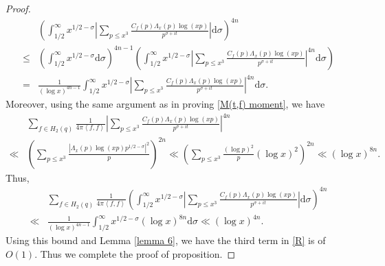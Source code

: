 \documentclass[11pt,reqno]{amsart}
\numberwithin{equation}{section}
\theoremstyle{plain}
\theoremstyle{definition}
\begin{document}
\begin{proof}
\begin{equation*}
\begin{split}
&\left(\int_{1/2}^\infty
x^{1/2-\sigma}\left|\sum_{p\leq x^3}
\frac{C_f(p)\Lambda_x(p)\log(xp)}{p^{\sigma+it}}\right|\mathrm{d}\sigma\right)^{4n}\\
\leq&\left(\int_{1/2}^\infty
x^{1/2-\sigma}\mathrm{d}\sigma\right)^{4n-1}\left(\int_{1/2}^\infty
x^{1/2-\sigma}\left|\sum_{p\leq x^3}
\frac{C_f(p)\Lambda_x(p)\log(xp)}{p^{\sigma+it}}\right|^{4n}\mathrm{d}\sigma\right)\\
=&\frac{1}{(\log x)^{4n-1}}\int_{1/2}^\infty
x^{1/2-\sigma}\left|\sum_{p\leq x^3}
\frac{C_f(p)\Lambda_x(p)\log(xp)}{p^{\sigma+it}}\right|^{4n}\mathrm{d}\sigma.
\end{split}
\end{equation*}
Moreover, using the same argument as in proving \eqref{M(t,f) moment},
we have
\begin{equation*}
\begin{split}
&\sum_{f\in H_2(q)}\frac{1}{4\pi \left<f,f\right>}\left|\sum_{p\leq x^3}
\frac{C_f(p)\Lambda_x(p)\log(xp)}{p^{\sigma+it}}\right|^{4n}\\
\ll&\left(\sum_{p\leq x^3}
\frac{\left|\Lambda_x(p)\log(xp)p^{1/2-\sigma}\right|^2}{p}\right)^{2n}
\ll \left(\sum_{p\leq x^3}
\frac{(\log p)^2}{p}(\log x)^2\right)^{2n}
\ll(\log x)^{8n}.
\end{split}
\end{equation*}
Thus,
\begin{equation*}
\begin{split}
&\sum_{f\in H_2(q)}\frac{1}{4\pi \left<f,f\right>}\left(\int_{1/2}^\infty
x^{1/2-\sigma}\left|\sum_{p\leq x^3}
\frac{C_f(p)\Lambda_x(p)\log(xp)}{p^{\sigma+it}}\right|\mathrm{d}\sigma\right)^{4n}\\
\ll &\frac{1}{(\log x)^{4n-1}}\int_{1/2}^\infty
x^{1/2-\sigma}(\log x)^{8n}\mathrm{d}\sigma\ll (\log x)^{4n}.
\end{split}
\end{equation*}
Using this bound and Lemma \ref{lemma 6}, we have the third term in \eqref{R}
is of $O(1)$.
Thus we complete the proof of proposition.
\end{proof}
\end{document}
